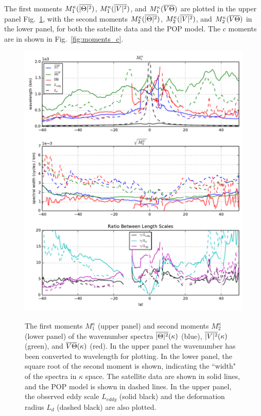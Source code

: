 \documentclass[10pt]{article}
\newcommand{\ol}{\ensuremath{\overline}}
\begin{document}
The first moments $M_1^\kappa( \ol{|\Theta|^2} )$, $M_1^\kappa( \ol{|V|^2} )$, and $M_1^\kappa( \ol{V \Theta} )$ are plotted in the upper panel Fig.~\ref{fig:moments_k}, with the second moments $M_2^\kappa( \ol{|\Theta|^2} )$, $M_2^\kappa( \ol{|V|^2} )$, and $M_2^\kappa( \ol{V \Theta} )$ in the lower panel, for both the satellite data and the POP model. The $c$ moments are in shown in Fig.~\ref{fig:moments_c}.

\begin{figure}[t]
  \noindent\includegraphics{../figures/moments_k.pdf}\\
  \caption{The first moments $M_1^\kappa$ (upper panel) and second moments $M_2^\kappa$ (lower panel) of the wavenumber spectra $\ol{|\Theta|^2}(\kappa)$ (blue), $\ol{|V|^2}(\kappa)$ (green), and $\ol{V\Theta}(\kappa)$ (red). In the upper panel the wavenumber has been converted to wavelength for plotting. In the lower panel, the square root of the second moment is shown, indicating the ``width" of the spectra in $\kappa$ space. The satellite data are shown in solid lines, and the POP model is shown in dashed lines. In the upper panel, the observed eddy scale $L_{eddy}$ (solid black) and the deformation radius $L_{d}$ (dashed black) are also plotted. }
  \label{fig:moments_k}
\end{figure}
\end{document}
